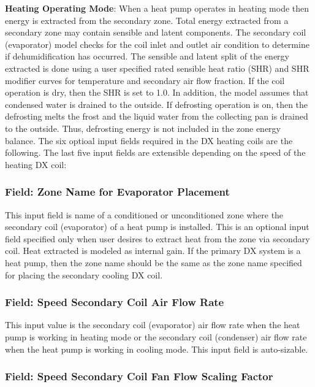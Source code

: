 \textbf{Heating Operating Mode}: When a heat pump operates in heating mode then energy is extracted from the secondary zone. Total energy extracted from a secondary zone may contain sensible and latent components. The secondary coil (evaporator) model checks for the coil inlet and outlet air condition to determine if dehumidification has occurred. The sensible and latent split of the energy extracted is done using a user specified rated sensible heat ratio (SHR) and SHR modifier curves for temperature and secondary air flow fraction. If the coil operation is dry, then the SHR is set to 1.0. In addition, the model assumes that condensed water is drained to the outside. If defrosting operation is on, then the defrosting melts the frost and the liquid water from the collecting pan is drained to the outside. Thus, defrosting energy is not included in the zone energy balance. The six optioal input fields required in the DX heating coils are the following. The last five input fields are extensible depending on the speed of the heating DX coil:

\subsubsection{Field: Zone Name for Evaporator Placement}\label{field-zone-name-for-evaporator-placement-2}

This input field is name of a conditioned or unconditioned zone where the secondary coil (evaporator) of a heat pump is installed. This is an optional input field specified only when user desires to extract heat from the zone via secondary coil. Heat extracted is modeled as internal gain. If the primary DX system is a heat pump, then the zone name should be the same as the zone name specified for placing the secondary cooling DX coil.

\subsubsection{Field: Speed Secondary Coil Air Flow Rate}\label{field-speed-secondary-coil-air-flow-rate}

This input value is the secondary coil (evaporator) air flow rate when the heat pump is working in heating mode or the secondary coil (condenser) air flow rate when the heat pump is working in cooling mode. This input field is auto-sizable.

\subsubsection{Field: Speed Secondary Coil Fan Flow Scaling Factor}\label{field-speed-secondary-coil-fan-flow-scaling-factor}

